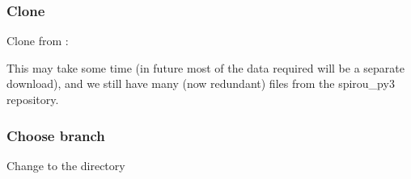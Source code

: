 \documentclass[a4paper,10pt,english]{report}
\begin{document}
\subsubsection{Clone}
\label{\detokenize{user/general/installation:clone}}
Clone from :

\begin{sphinxVerbatim}[commandchars=\\\{\}]
   
\end{sphinxVerbatim}

This may take some time (in future most of the data required will be a separate download),
and we still have many (now redundant) files from the spirou\_py3 repository.


\subsubsection{Choose branch}
\label{\detokenize{user/general/installation:choose-branch}}\label{\detokenize{user/general/installation:installation-choose-branch}}
Change to the  directory
\end{document}
